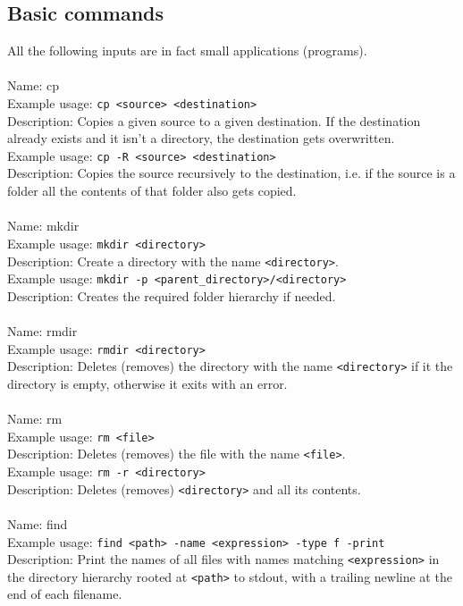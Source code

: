 \documentclass[a4paper,10pt]{article}
\begin{document}
\subsection{Basic commands}
All the following inputs are in fact small applications (programs).
\\
\\
Name: cp
\\
Example usage: \verb!cp <source> <destination>!
\\
Description: Copies a given source to a given destination. If the destination already exists and it isn't a directory, the destination gets overwritten.
\\
Example usage: \verb!cp -R <source> <destination>!
\\
Description: Copies the source recursively to the destination, i.e. if the source is a folder all the contents of that folder also gets copied.
\\
\\
Name: mkdir
\\
Example usage: \verb!mkdir <directory>!
\\
Description: Create a directory with the name \verb!<directory>!.
\\
Example usage: \verb!mkdir -p <parent_directory>/<directory>!
\\
Description: Creates the required folder hierarchy if needed.
\\
\\
Name: rmdir
\\
Example usage: \verb!rmdir <directory>!
\\
Description: Deletes (removes) the directory with the name \verb!<directory>! if it the directory is empty, otherwise it exits with an error.
\\
\\
Name: rm
\\
Example usage: \verb!rm <file>!
\\
Description: Deletes (removes) the file with the name \verb!<file>!.
\\
Example usage: \verb!rm -r <directory>!
\\
Description: Deletes (removes) \verb!<directory>! and all its contents.
\\
\\ 
Name: find
\\
Example usage: \verb!find <path> -name <expression> -type f -print!
\\
Description: Print the names of all files with names matching \verb!<expression>! in the directory hierarchy rooted at \verb!<path>! to stdout, with a trailing newline at the end of each filename.
\end{document}
